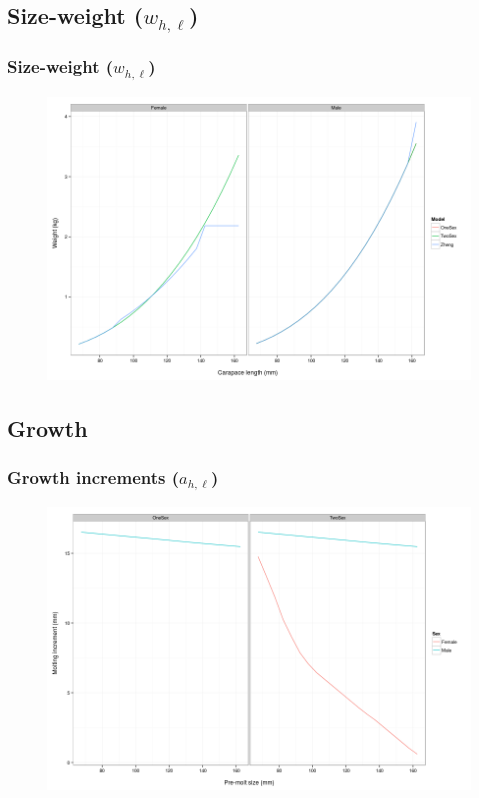 \documentclass{beamer}
\begin{document}
\subsection{Size-weight ($w_{h,\ell}$)}
\begin{frame}
\frametitle{Size-weight ($w_{h,\ell}$)}
\begin{figure}[!htbp]
  \centering
  \includegraphics[width=0.75\linewidth]{figure/length_weight-1.png}
\end{figure}
\end{frame}


\subsection{Growth}
\begin{frame}
\frametitle{Growth increments ($a_{h,\ell}$)}
\begin{figure}[!htbp]
  \centering
  \includegraphics[width=0.75\linewidth]{figure/growth_inc-1.png}
\end{figure}
\end{frame}

\end{document}
